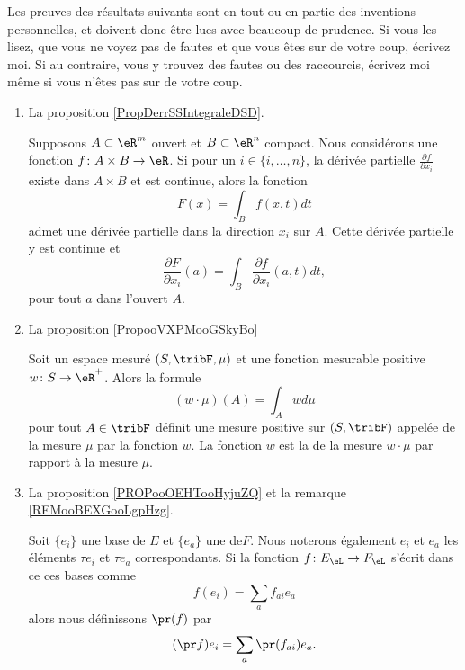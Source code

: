 Les preuves des résultats suivants sont en tout ou en partie des inventions personnelles, et doivent donc être lues avec beaucoup de prudence. Si vous les lisez, que vous ne voyez pas de fautes et que vous êtes sur de votre coup, écrivez moi. Si au contraire, vous y trouvez des fautes ou des raccourcis, écrivez moi même si vous n'êtes pas sur de votre coup.
\begin{enumerate}
    \item
        La proposition \ref{PropDerrSSIntegraleDSD}.
        \begin{proposition}
    Supposons $A\subset\eR^m$ ouvert et $B\subset\eR^n$ compact. Nous considérons une fonction \( f\colon A\times B\to \eR\). Si pour un $i\in\{ i,\ldots,n \}$, la dérivée partielle $\frac{ \partial f }{ \partial x_i }$ existe dans $A\times B$ et est continue, alors la fonction
    \begin{equation}
        F(x)=\int_Bf(x,t)dt
    \end{equation}
    admet une dérivée partielle dans la direction \( x_i\) sur \( A\). Cette dérivée partielle y est continue et
    \begin{equation}
        \frac{ \partial F }{ \partial x_i }(a)=\int_B\frac{ \partial f }{ \partial x_i }(a,t)dt,
    \end{equation}
    pour tout \( a\) dans l'ouvert \( A\).
\end{proposition}
        \item
            La proposition \ref{PropooVXPMooGSkyBo}
            \begin{proposition}
    Soit un espace mesuré \( (S,\tribF,\mu)\) et une fonction mesurable positive \( w\colon S\to \bar\eR^+\). Alors la formule
    \begin{equation}
        (w\cdot \mu)(A)=\int_Awd\mu
    \end{equation}
    pour tout \( A\in \tribF\) définit une mesure positive sur \( (S,\tribF)\) appelée  de la mesure \( \mu\) par la fonction \( w\). La fonction \( w\) est la  de la mesure \( w\cdot \mu\) par rapport à la mesure \( \mu\).
            \end{proposition}
        \item
            La proposition \ref{PROPooOEHTooHyjuZQ} et la remarque \ref{REMooBEXGooLgpHzg}.

Soit \( \{ e_i \}\) une base de \( E \) et \(\{ e_a \}\) une  de\( F\). Nous noterons également \( e_i\) et \( e_a\) les éléments \( \tau e_i\) et \( \tau e_a\) correspondants. Si la fonction \( f\colon E_{\eL}\to F_{\eL}\) s'écrit dans ce ces bases comme
\begin{equation}
    f(e_i)=\sum_af_{ai}e_a
\end{equation}
alors nous définissons \( \pr(f)\) par 
\begin{equation}        \label{EQooUWJLooTsbGZj}
    (\pr f)e_i=\sum_a\pr(f_{ai})e_a.
\end{equation}


\end{enumerate}
